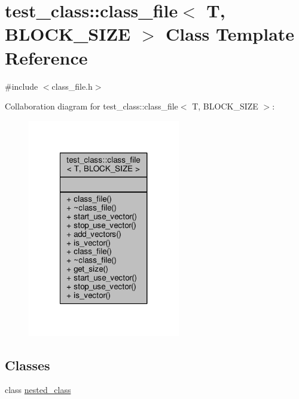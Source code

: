 \hypertarget{classtest__class_1_1class__file}{\section{test\-\_\-class\-:\-:class\-\_\-file$<$ T, B\-L\-O\-C\-K\-\_\-\-S\-I\-Z\-E $>$ Class Template Reference}
\label{classtest__class_1_1class__file}
}


{\ttfamily \#include $<$class\-\_\-file.\-h$>$}



Collaboration diagram for test\-\_\-class\-:\-:class\-\_\-file$<$ T, B\-L\-O\-C\-K\-\_\-\-S\-I\-Z\-E $>$\-:\nopagebreak
\begin{figure}[H]
\begin{center}
\leavevmode
\includegraphics[width=188pt]{classtest__class_1_1class__file__coll__graph}
\end{center}
\end{figure}
\subsection*{Classes}
\begin{DoxyCompactItemize}
\item 
class \hyperlink{classtest__class_1_1class__file_1_1nested__class}{nested\-\_\-class}
\end{DoxyCompactItemize}
